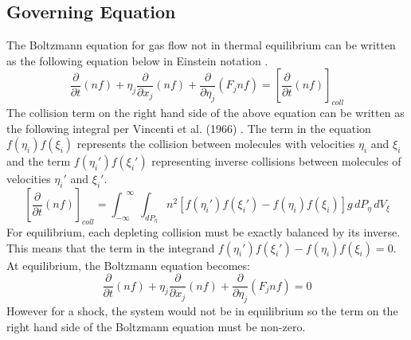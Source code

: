 \documentclass[a4paper]{article}
\begin{document}
\subsection{Governing Equation}
The Boltzmann equation for gas flow not in thermal equilibrium can be written as the following equation below in Einstein notation \cite{vincenti1975introduction}.
\begin{equation}
    \dfrac{\partial}{\partial t}(nf) + \eta_j \dfrac{\partial}{\partial x_j} (nf)  + \dfrac{\partial}{\partial \eta_j} (F_j nf) = \left[\dfrac{\partial}{\partial t}  (nf) \right]_{coll}
\end{equation}
The collision term on the right hand side of the above equation can be written as the following integral per Vincenti et al. (1966) \cite{vincenti1975introduction}. The term in the equation $f(\eta_i)f(\xi_i)$ represents the collision between molecules with velocities $\eta_i$ and $\xi_i$ and the term $f(\eta_i')f(\xi_i')$ representing inverse collisions between molecules of velocities $\eta_i'$ and $\xi_i'$. 
\begin{equation}
    \left[\dfrac{\partial}{\partial t} (nf)\right]_{coll} = \int^{\,\,\,\infty}_{-\infty} \int_{dP_{\eta}} n^2 [f(\eta_i')f(\xi_i') - f(\eta_i)f(\xi_i)]g\,dP_{\eta}\,dV_\xi
\end{equation}
For equilibrium, each depleting collision must be exactly balanced by its inverse. This means that the term in the integrand $f(\eta_i')f(\xi_i') - f(\eta_i)f(\xi_i) = 0$. At equilibrium, the Boltzmann equation becomes:
\begin{equation}
    \dfrac{\partial}{\partial t}(nf) + \eta_j \dfrac{\partial}{\partial x_j} (nf)  + \dfrac{\partial}{\partial \eta_j} (F_j nf) = 0
\end{equation}
However for a shock, the system would not be in equilibrium so the term on the right hand side of the Boltzmann equation must be non-zero. 
\end{document}
